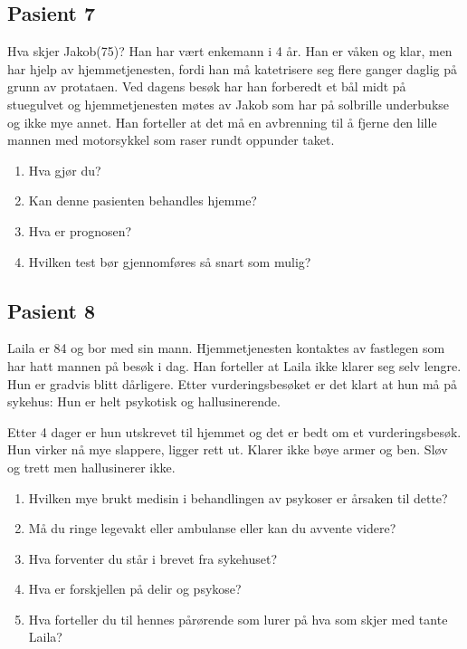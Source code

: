 			\subsection{Pasient 7}
				Hva skjer Jakob(75)? Han har vært enkemann i 4 år. Han er våken og klar, men har hjelp av hjemmetjenesten, fordi han må katetrisere seg flere ganger daglig på grunn av protataen. Ved dagens besøk har han forberedt et bål midt på stuegulvet og hjemmetjenesten møtes av Jakob som har på solbrille underbukse og ikke mye annet. Han forteller at det må en avbrenning til å fjerne den lille mannen med motorsykkel som raser rundt oppunder taket. 
				\begin{enumerate}
					\item Hva gjør du?
					\item Kan denne pasienten behandles hjemme?
					\item Hva er prognosen?
					\item Hvilken test bør gjennomføres så snart som mulig?
				\end{enumerate}
			\subsection{Pasient 8}
				Laila er 84 og bor med sin mann. Hjemmetjenesten kontaktes av fastlegen som har hatt mannen på besøk i dag. Han forteller at Laila ikke klarer seg selv lengre. Hun er gradvis blitt dårligere. Etter vurderingsbesøket er det klart at hun må på sykehus: Hun er helt psykotisk og hallusinerende.\par
				Etter 4 dager er hun utskrevet til hjemmet og det er bedt om et vurderingsbesøk. Hun virker nå mye slappere, ligger rett ut. Klarer ikke bøye armer og ben. Sløv og trett men hallusinerer ikke.
				\begin{enumerate}
						\item Hvilken mye brukt medisin i behandlingen av psykoser er årsaken til dette?
						\item Må du ringe legevakt eller ambulanse eller kan du avvente videre?
						\item Hva forventer du står i brevet fra sykehuset?
						\item Hva er forskjellen på delir og psykose? 
						\item Hva forteller du til hennes pårørende som lurer på hva som skjer med tante Laila?
					\end{enumerate}